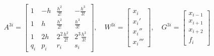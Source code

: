 \begin{equation}

\label{mc:eq4}

    A^{3i}=

\begin{bmatrix}

 1 &   -h &   \frac{h^{2}}{2!} &   -\frac{h^{3}}{3!}

   \\[1mm]

     1 &     h &   \frac{h^{2}}{2!} &     \frac{h^{3}}{3!}

   \\[1mm]

     1 &     2h & 2^2  \frac{h^{2}}{2!} & 2^3  \frac{h^{3}}{3!}

 \\[1mm]

    q_i &   p_i &     r_i &     s_i

 \end{bmatrix}

 ,\quad 

 W^{3i}=

\begin{bmatrix}

x_i

   \\

x_i'

   \\

x_i''

   \\

x_i'''

 \end{bmatrix}

 ,\quad 

 G^{3i}=

\begin{bmatrix}

x_{i-1}

   \\

x_{i+1}

   \\

x_{i+2}

    \\

f_i

 \end{bmatrix}

\end{equation}

